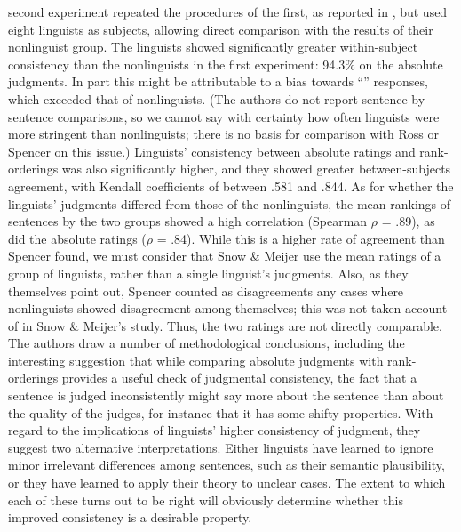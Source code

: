  second experiment repeated the procedures of the first, as reported in , but used eight linguists as subjects, allowing direct comparison with the results of their nonlinguist group. The linguists showed significantly greater within-subject consistency than the nonlinguists in the first experiment: 94.3\% on the absolute judgments. In part this might be attributable to a bias towards ``\textminus'' responses, which exceeded that of nonlinguists. (The authors do not report sentence-by-sentence comparisons, so we cannot say with certainty how often linguists were more stringent than nonlinguists; there is no basis for comparison with Ross or Spencer on this issue.) Linguists' consistency between absolute ratings and rank-orderings was also significantly higher, and they showed greater between-subjects agreement, with Kendall coefficients of between .581 and .844. As for whether the linguists' judgments differed from those of the nonlinguists, the mean rankings of sentences by the two groups
showed a high correlation (Spearman {$\rho$} = .89), as did the absolute ratings ({$\rho$} = .84). While this is a higher rate of agreement than Spencer found, we must consider that Snow \& Meijer use the mean ratings of a group of linguists, rather than a single linguist's judgments. Also, as they themselves point out, Spencer counted as disagreements any cases where nonlinguists showed disagreement among themselves; this was not taken account of in Snow \& Meijer's study. Thus, the two ratings are not directly comparable. The authors draw a number of methodological conclusions, including the interesting suggestion that while comparing absolute judgments with rank-orderings provides a useful check of judgmental consistency, the fact that a sentence is judged inconsistently might say more about the sentence than about the quality of the judges, for instance that it has some shifty properties. With regard to the implications of linguists' higher consistency of judgment, they suggest two alternative interpretations. Either linguists have learned to ignore minor irrelevant differences among sentences, such as their semantic plausibility, or they have learned to apply their theory to unclear cases. The extent to which each of these turns out to be right will obviously determine whether this improved consistency is a desirable property.

